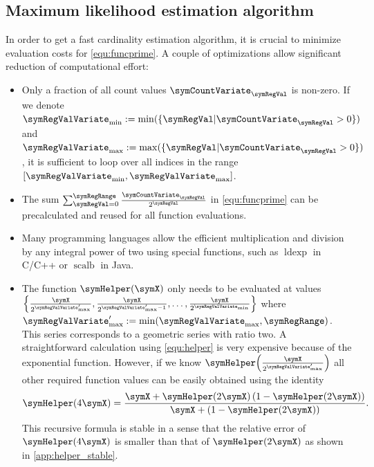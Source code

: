\documentclass[a4paper]{scrartcl}
\begin{document}
\subsection{Maximum likelihood estimation algorithm}
In order to get a fast cardinality estimation algorithm, it is crucial to minimize evaluation costs for \eqref{equ:funcprime}. A couple of optimizations allow significant reduction of computational effort:
\begin{itemize}
\item Only a fraction of all count values $\symCountVariate_\symRegVal$ is non-zero. If we denote $\symRegValVariate_\text{min}:=\min(\lbrace \symRegVal\vert\symCountVariate_\symRegVal>0\rbrace)$ and $\symRegValVariate_\text{max}:=\max(\lbrace \symRegVal\vert\symCountVariate_\symRegVal>0\rbrace)$,  it is sufficient to loop over all indices in the range $[\symRegValVariate_\text{min}, \symRegValVariate_\text{max}]$.
\item The sum $\sum_{\symRegVal=0}^\symRegRange \frac{\symCountVariate_\symRegVal}{2^\symRegVal}$ in \eqref{equ:funcprime} can be precalculated and reused for all function evaluations.
\item Many programming languages allow the efficient multiplication and division by any integral power of two using special functions, such as $\operatorname{ldexp}$ in C/C++ or $\operatorname{scalb}$ in Java.
\item The function $\symHelper(\symX)$ only needs to be evaluated at values $\left\lbrace\frac{\symX}{2^{\symRegValVariate'_\text{max}}},\frac{\symX}{2^{\symRegValVariate'_\text{max}-1}},\ldots,\frac{\symX}{2^{\symRegValVariate_\text{min}}}\right\rbrace$ where $\symRegValVariate'_\text{max} := \min(\symRegValVariate_\text{max}, \symRegRange)$. This series corresponds to a geometric series with ratio two. A straightforward calculation using \eqref{equ:helper} is very expensive because of the exponential function. However, if we know $\symHelper\!\left(\frac{\symX}{2^{\symRegValVariate'_\text{max}}}\right)$ all other required function values can be easily obtained using the identity
\begin{equation}
\label{equ:helper_recursion1}
\symHelper(4\symX) = \frac{\symX+\symHelper(2\symX)\left(1-\symHelper(2\symX)\right)}{\symX+\left(1-\symHelper(2\symX)\right)}.
\end{equation}
This recursive formula is stable in a sense that the relative error of $\symHelper(4\symX)$ is smaller than that of $\symHelper(2\symX)$ as shown in \cref{app:helper_stable}.


\end{itemize}
\end{document}
